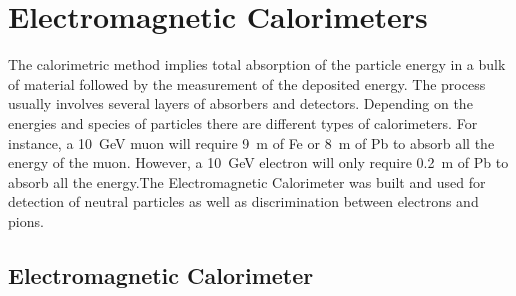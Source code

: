 \section{Electromagnetic Calorimeters}\label{sec:clas.ec}

The calorimetric method implies total absorption of the particle energy in a bulk of material followed by the measurement of the deposited energy. The process usually involves several layers of absorbers and detectors. Depending on the energies and species of particles there are different types of calorimeters. For instance, a 10~GeV muon will require 9~m of Fe or 8~m of Pb to absorb all the energy of the muon. However, a 10~GeV electron will only require 0.2~m of Pb to absorb all the energy.The Electromagnetic Calorimeter was built and used for detection of neutral particles as well as discrimination between electrons and pions.


\subsection{Electromagnetic Calorimeter}

